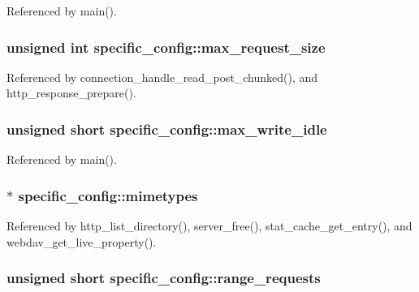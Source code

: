 Referenced by main().

\hypertarget{structspecific__config_a3e19e97363aad607e729d09aa8e51c16}{
\subsubsection[{max\-\_\-request\-\_\-size}]{\setlength{\rightskip}{0pt plus 5cm}unsigned int specific\-\_\-config\-::max\-\_\-request\-\_\-size}}\label{structspecific__config_a3e19e97363aad607e729d09aa8e51c16}


Referenced by connection\-\_\-handle\-\_\-read\-\_\-post\-\_\-chunked(), and http\-\_\-response\-\_\-prepare().

\hypertarget{structspecific__config_afa6119faf131760f27785ff74c4af07b}{
\subsubsection[{max\-\_\-write\-\_\-idle}]{\setlength{\rightskip}{0pt plus 5cm}unsigned short specific\-\_\-config\-::max\-\_\-write\-\_\-idle}}\label{structspecific__config_afa6119faf131760f27785ff74c4af07b}


Referenced by main().

\hypertarget{structspecific__config_af95ed73a2b67582fced117bcdc826348}{
\subsubsection[{mimetypes}]{$\ast$ specific\-\_\-config\-::mimetypes}}\label{structspecific__config_af95ed73a2b67582fced117bcdc826348}


Referenced by http\-\_\-list\-\_\-directory(), server\-\_\-free(), stat\-\_\-cache\-\_\-get\-\_\-entry(), and webdav\-\_\-get\-\_\-live\-\_\-property().

\hypertarget{structspecific__config_a66e2db865940e5c20d5c263718ce11d9}{
\subsubsection[{range\-\_\-requests}]{\setlength{\rightskip}{0pt plus 5cm}unsigned short specific\-\_\-config\-::range\-\_\-requests}}\label{structspecific__config_a66e2db865940e5c20d5c263718ce11d9}


